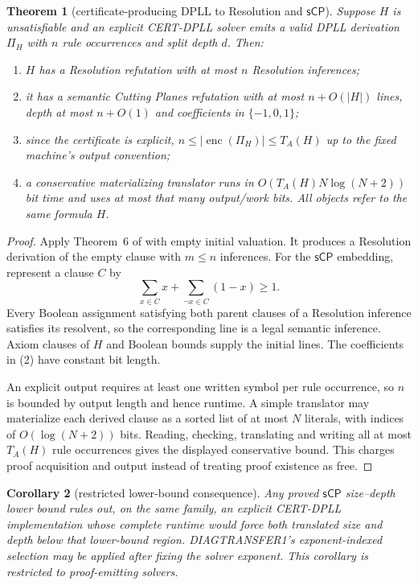 \documentclass[11pt]{article}
\newtheorem{theorem}{Theorem}
\newtheorem{corollary}[theorem]{Corollary}
\newcommand{\sCP}{\mathsf{sCP}}
\begin{document}
\begin{theorem}[certificate-producing DPLL to Resolution and $\sCP$]
Suppose $H$ is unsatisfiable and an explicit CERT-DPLL solver emits a valid
DPLL derivation $\Pi_H$ with $n$ rule occurrences and split depth $d$.  Then:
\begin{enumerate}
\item $H$ has a Resolution refutation with at most $n$ Resolution inferences;
\item it has a semantic Cutting Planes refutation with at most $n+O(|H|)$
lines, depth at most $n+O(1)$ and coefficients in $\{-1,0,1\}$;
\item since the certificate is explicit, $n\le |\operatorname{enc}(\Pi_H)|
\le T_A(H)$ up to the fixed machine's output convention;
\item a conservative materializing translator runs in
$O(T_A(H)N\log(N+2))$ bit time and uses at most that many output/work bits.
All objects refer to the same formula $H$.
\end{enumerate}
\end{theorem}

\begin{proof}
Apply Theorem~6 of \cite{berger} with empty initial valuation.  It produces a
Resolution derivation of the empty clause with $m\le n$ inferences.  For the
$\sCP$ embedding, represent a clause $C$ by
\[
 \sum_{x\in C}x+\sum_{\neg x\in C}(1-x)\ge1.             \tag{2}
\]
Every Boolean assignment satisfying both parent clauses of a Resolution
inference satisfies its resolvent, so the corresponding line is a legal
semantic inference.  Axiom clauses of $H$ and Boolean bounds supply the
initial lines.  The coefficients in (2) have constant bit length.

An explicit output requires at least one written symbol per rule occurrence,
so $n$ is bounded by output length and hence runtime.  A simple translator
may materialize each derived clause as a sorted list of at most $N$ literals,
with indices of $O(\log(N+2))$ bits.  Reading, checking, translating and
writing all at most $T_A(H)$ rule occurrences gives the displayed conservative
bound.  This charges proof acquisition and output instead of treating proof
existence as free.
\end{proof}

\begin{corollary}[restricted lower-bound consequence]
Any proved $\sCP$ size--depth lower bound rules out, on the same family, an
explicit CERT-DPLL implementation whose complete runtime would force both
translated size and depth below that lower-bound region.  DIAGTRANSFER1's
exponent-indexed selection may be applied after fixing the solver exponent.
This corollary is restricted to proof-emitting solvers.
\end{corollary}
\end{document}
